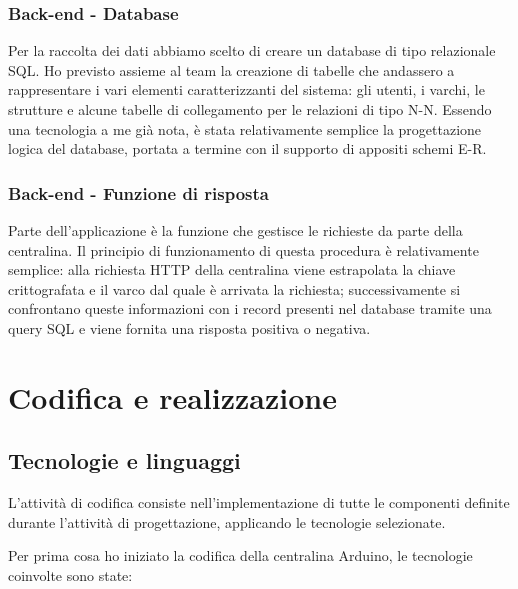 \subsubsection{Back-end - Database}
Per la raccolta dei dati abbiamo scelto di creare un database di tipo relazionale SQL.
Ho previsto assieme al team la creazione di tabelle che andassero a rappresentare i vari elementi caratterizzanti del sistema: gli utenti, i varchi, le strutture e alcune tabelle di collegamento per le relazioni di tipo N-N.
Essendo una tecnologia a me già nota, è stata relativamente semplice la progettazione logica del database, portata a termine con il supporto di appositi schemi E-R.

\subsubsection{Back-end - Funzione di risposta}
Parte dell'applicazione è la funzione che gestisce le richieste da parte della centralina. Il principio di funzionamento di questa procedura è relativamente semplice: alla richiesta HTTP della centralina viene estrapolata la chiave crittografata e il varco dal quale è arrivata la richiesta; successivamente si confrontano queste informazioni con i record presenti nel database tramite una query SQL e viene fornita una risposta positiva o negativa. 

\section{Codifica e realizzazione}
\subsection{Tecnologie e linguaggi}
L'attività di codifica consiste nell'implementazione di tutte le componenti definite durante l'attività di progettazione, applicando le tecnologie selezionate.

Per prima cosa ho iniziato la codifica della centralina Arduino, le tecnologie coinvolte sono state:

